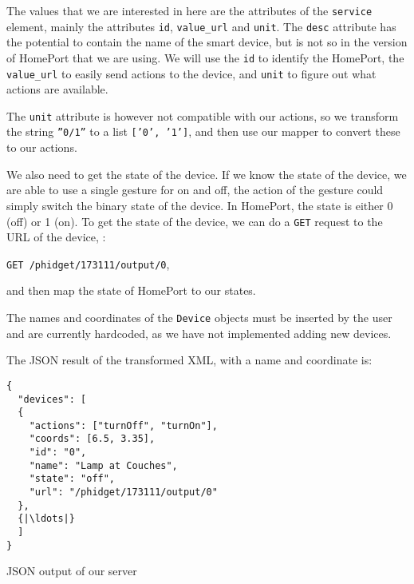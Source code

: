 The values that we are interested in here are the attributes of the \texttt{service} element, 
mainly the attributes \texttt{id}, \texttt{value\_url} and \texttt{unit}. 
The \texttt{desc} attribute has the potential to contain the name of the smart device, 
but is not so in the version of HomePort that we are using. 
We will use the \texttt{id} to identify the HomePort, 
the \texttt{value\_url} to easily send actions to the device, 
and \texttt{unit} to figure out what actions are available. 

The \texttt{unit} attribute is however not compatible with our actions, 
so we transform the string \texttt{''0/1''} to a list \texttt{['0', '1']}, 
and then use our mapper to convert these to our actions. 

We also need to get the state of the device. 
If we know the state of the device, 
we are able to use a single gesture for on and off,
\ie the action of the gesture could simply switch the binary state of the device. 
In HomePort, the state is either 0 (off) or 1 (on). 
To get the state of the device, 
we can do a \texttt{GET} request to the URL of the device, \eg:
\begin{center}
  \texttt{GET /phidget/173111/output/0},
\end{center}
and then map the state of HomePort to our states.

The names and coordinates of the \texttt{Device} objects must be inserted by the user and are currently hardcoded, 
as we have not implemented adding new devices. 

The JSON result of the transformed XML, with a name and coordinate is:

\begin{listing}
\begin{verbatim}
{
  "devices": [
  {
    "actions": ["turnOff", "turnOn"], 
    "coords": [6.5, 3.35], 
    "id": "0", 
    "name": "Lamp at Couches", 
    "state": "off", 
    "url": "/phidget/173111/output/0"
  }, 
  {|\ldots|}
  ]
}
\end{verbatim}
\caption{JSON output of our server}
\label{lst:serveroutput}
\end{listing}

